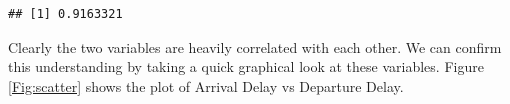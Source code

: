 \documentclass[11pt, letterpaper, twoside]{memoir}\usepackage{knitr}
\begin{document}
\begin{knitrout}
\color{fgcolor}\begin{kframe}
\begin{alltt}
\end{alltt}
\end{kframe}
\end{knitrout}

\begin{knitrout}
\color{fgcolor}\begin{kframe}
\begin{alltt}
 \hlstd{=}\hlstd{)}
\end{alltt}
\begin{verbatim}
## [1] 0.9163321
\end{verbatim}
\end{kframe}
\end{knitrout}

  Clearly the two variables are heavily correlated with each other. We can confirm this understanding by taking a quick graphical look at these variables. Figure \ref{Fig:scatter}  shows the plot of Arrival Delay vs Departure Delay. 
\end{document}
